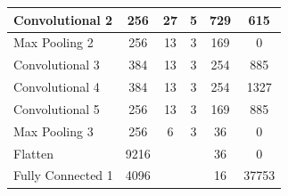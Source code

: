 \begin{center}
\begin{table}[]
\begin{tabular}{|l|c|c|c|c|c|}
Convolutional 2   & 256                                                            & 27                                                            & 5                                                             & 729                                                            & 615                 \\ \hline
Max Pooling 2     & 256                                                            & 13                                                            & 3                                                             & 169                                                            & 0                   \\ \hline
Convolutional 3   & 384                                                            & 13                                                            & 3                                                             & 254                                                            & 885                 \\ \hline
Convolutional 4   & 384                                                            & 13                                                            & 3                                                             & 254                                                            & 1327                \\ \hline
Convolutional 5   & 256                                                            & 13                                                            & 3                                                             & 169                                                            & 885                 \\ \hline
Max Pooling 3     & 256                                                            & 6                                                             & 3                                                             & 36                                                             & 0                   \\ \hline
Flatten           & 9216                                                           &                                                               &                                                               & 36                                                             & 0                   \\ \hline
Fully Connected 1 & 4096                                                           &                                                               &                                                               & 16                                                             & 37753               \\ \hline

\end{tabular}
\end{table}
\end{center}
